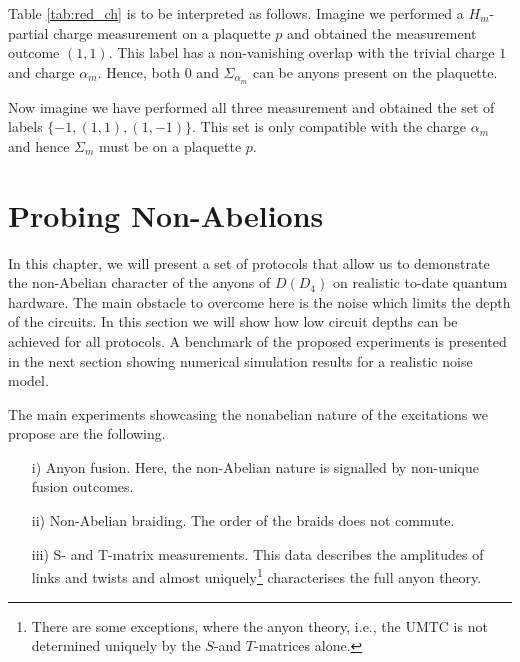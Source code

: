 \documentclass[two column]{article}
\newcommand{\caro}[1]{\textcolor{red}{[#1]}}
\begin{document}

Table \ref{tab:red_ch} is to be interpreted as follows. Imagine we performed a $H_m$-partial charge measurement on a plaquette $p$ and obtained the measurement outcome $(1,1)$. This label has a non-vanishing overlap with the trivial charge $1$ and charge $\alpha_m$. Hence, both $0$ and $\Sigma_{\alpha_m}$ can be anyons present on the plaquette.

Now imagine we have performed all three measurement and obtained the set of labels $\{-1, (1, 1), (1, -1)\}$. This set is only compatible with the charge $\alpha_m$ and hence $\Sigma_m$ must be on a plaquette $p$.



\section{Probing Non-Abelions}

In this chapter, we will present a set of protocols that allow us to demonstrate the non-Abelian character of the anyons of $D(D_4)$ on realistic to-date quantum hardware. The main obstacle to overcome here is the noise which limits the depth of the circuits. In this section we will show how low circuit depths can be achieved for all protocols. A benchmark of the proposed experiments is presented in the next section showing numerical simulation results for a realistic noise model.


The main experiments showcasing the nonabelian nature of the excitations we propose are the following.
\begin{itemize}

\item[i)] Anyon fusion. Here, the non-Abelian nature is signalled by non-unique fusion outcomes.

\item[ii)] Non-Abelian braiding. The order of the braids does not commute.

\item[iii)] S- and T-matrix measurements. This data describes the amplitudes of links and twists and almost uniquely\footnote{There are some exceptions, where the anyon theory, i.e., the UMTC is not determined uniquely by the $S$-and $T$-matrices alone\cite{notdetermined2021}.} characterises the full anyon theory.
\end{itemize}
\end{document}
